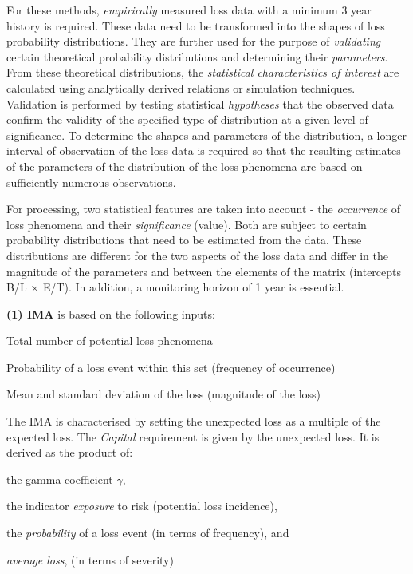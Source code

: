 \documentclass{article}
\begin{document}
For these methods, \emph{empirically} measured loss data with a minimum 3 year history is required. These data need to be transformed into the shapes of loss probability distributions. They are further used for the purpose of \emph{validating} certain theoretical probability distributions and determining their \emph{parameters}. From these theoretical distributions, the \emph{statistical characteristics of interest} are calculated using analytically derived relations or simulation techniques. Validation is performed by testing statistical \emph{hypotheses} that the observed data confirm the validity of the specified type of distribution at a given level of significance. To determine the shapes and parameters of the distribution, a longer interval of observation of the loss data is required so that the resulting estimates of the parameters of the distribution of the loss phenomena are based on sufficiently numerous observations.

For processing, two statistical features are taken into account - the \emph{occurrence} of loss phenomena and their \emph{significance} (value). Both are subject to certain probability distributions that need to be estimated from the data. These distributions are different for the two aspects of the loss data and differ in the magnitude of the parameters and between the elements of the matrix (intercepts B/L $\times$ E/T). In addition, a monitoring horizon of 1 year is essential.


\textbf{(1) IMA} is based on the following inputs:

\begin{compactitem}
    \item Total number of potential loss phenomena
    \item Probability of a loss event within this set (frequency of occurrence)
    \item Mean and standard deviation of the loss (magnitude of the loss)
\end{compactitem}

The IMA is characterised by setting the unexpected loss as a multiple of the expected loss. The \emph{Capital} requirement is given by the unexpected loss. It is derived as the product of:

\begin{compactitem}
    \item the gamma coefficient $\gamma$,
    \item the indicator \emph{exposure} to risk (potential loss incidence),
    \item the \emph{probability} of a loss event (in terms of frequency), and
    \item \emph{average loss}, (in terms of severity)
\end{compactitem}
\end{document}
